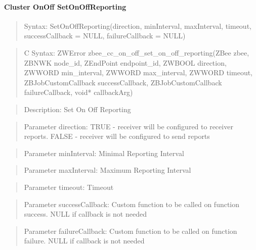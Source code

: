 \paragraph{Cluster OnOff SetOnOffReporting}
\begin{quote}Syntax: SetOnOffReporting(direction, minInterval, maxInterval, timeout, successCallback = NULL, failureCallback = NULL)\end{quote}
\begin{quote}C Syntax: ZWError zbee\_cc\_on\_off\_set\_on\_off\_reporting(ZBee zbee, ZBNWK node\_id, ZEndPoint endpoint\_id, ZWBOOL direction, ZWWORD min\_interval, ZWWORD max\_interval, ZWWORD timeout, ZBJobCustomCallback successCallback, ZBJobCustomCallback failureCallback, void* callbackArg)\end{quote}
\begin{quote}Description: Set On Off Reporting\end{quote}
\begin{quote}Parameter direction: TRUE  - receiver will be configured to receiver reports. FALSE - receiver will be configured to send reports\end{quote}
\begin{quote}Parameter minInterval: Minimal Reporting Interval\end{quote}
\begin{quote}Parameter maxInterval: Maximum Reporting Interval\end{quote}
\begin{quote}Parameter timeout: Timeout\end{quote}
\begin{quote}Parameter successCallback: Custom function to be called on function success. NULL if callback is not needed\end{quote}
\begin{quote}Parameter failureCallback: Custom function to be called on function failure. NULL if callback is not needed\end{quote}


